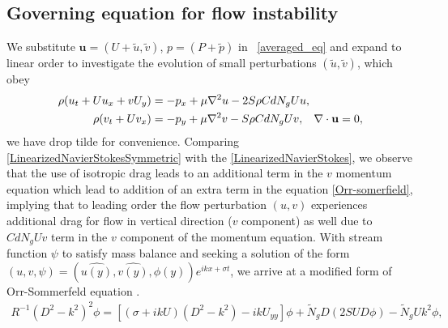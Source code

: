 \documentclass[12pt]{report}   %
\newcommand{\bu}{\mathbf{u}}
\newcommand{\Rey}{{R}}
\newcommand{\Ndg}{\tilde{N}_g}
\begin{document}
\subsection{Governing equation for flow instability}
We substitute $\bu = (U+\tilde{u}, \tilde{v})$, $p = (P+\tilde{p}) $ in ~\eqref{averaged_eq} and expand to linear order to investigate the evolution of small perturbations $(\tilde{u}, \tilde{v})$, which obey 
\begin{equation}
\begin{split}
\rho(u_t+U u_x+vU_y) &= -p_x+ {\mu}\nabla^2u-2S\rho C dN_{g}Uu, \\
\rho(v_t+ Uv_x) &= -p_y+ {\mu}\nabla^2v - S\rho C d N_g Uv, \hspace{0.3cm} \nabla\cdot\bu=0,
\label{LinearizedNavierStokesSymmetric}
\end{split} 
\end{equation}
we have drop tilde for convenience. Comparing \eqref{LinearizedNavierStokesSymmetric} with the \eqref{LinearizedNavierStokes}, we observe that the use of isotropic drag leads to an additional term in the $v$ momentum equation which lead to addition of an extra term in the equation  \ref{Orr-somerfield}, implying that to leading order the flow perturbation $(u,v)$ experiences additional drag for flow in vertical direction ($v$ component) as well due to $C d N_g Uv$ term in the $v$ component of the momentum equation. With stream function $\psi$ to satisfy mass balance and seeking a solution of the form $(u,v,\psi) = (\hat{u(y)},\hat{v(y)},\phi(y)) e^{ikx+\sigma t}$, we arrive at a modified form of Orr-Sommerfeld equation \cite{Drazin81,Chen97,Chu91}.
\begin{equation}
\begin{split}
\Rey^{-1}\left(D^2 -k^{2} \right)^2\phi = \left[ \left({\sigma}+ikU\right) \left(D^2-k^2\right) -ikU_{yy}\right]\phi + 
\Ndg D\left(2 S U D \phi\right) - \Ndg U k^2\phi,
\label{SymmetricOrr-somerfield}
\end{split}
\end{equation}
\end{document}
